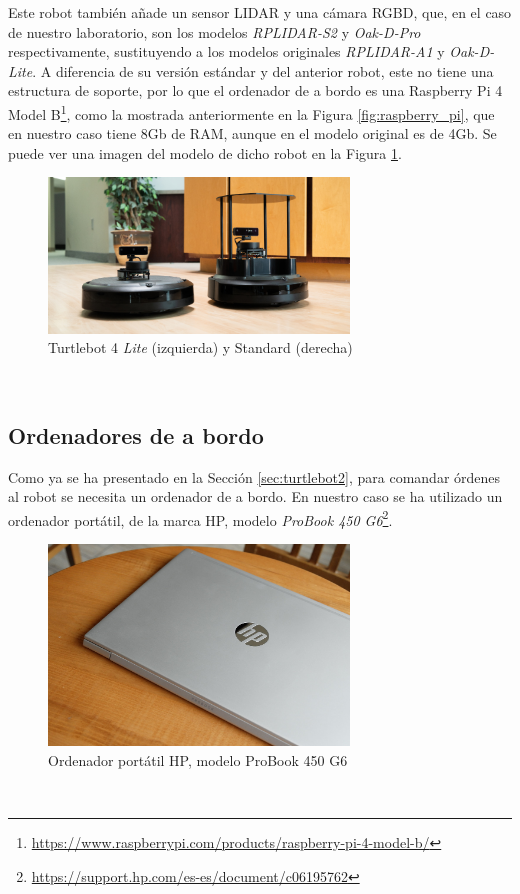 Este robot también añade un sensor LIDAR y una cámara RGBD, que, en el caso de
nuestro laboratorio, son los modelos \textit{RPLIDAR-S2} y \textit{Oak-D-Pro}
respectivamente, sustituyendo a los modelos originales \textit{RPLIDAR-A1} y
\textit{Oak-D-Lite}.
A diferencia de su versión estándar y del anterior robot, este no tiene una
estructura de soporte, por lo que el ordenador de a bordo es una Raspberry
Pi 4 Model B\footnote{
\url{https://www.raspberrypi.com/products/raspberry-pi-4-model-b/}}, como la
mostrada anteriormente en la Figura \ref{fig:raspberry_pi}, que en nuestro caso
tiene 8Gb de RAM, aunque en el modelo original es de 4Gb.
Se puede ver una imagen del modelo de dicho robot en la Figura
\ref{fig:turtlebot4}.
\\

\begin{figure} [h!]
  \begin{center}
    \includegraphics[width=8cm]{figs/turtlebot4}
  \end{center}
  \caption{Turtlebot 4 \textit{Lite} (izquierda) y Standard (derecha) \cite{turtlebot4}}
  \label{fig:turtlebot4}
\end{figure}\


\subsection{Ordenadores de a bordo}
\label{sec:a_bordo}

Como ya se ha presentado en la Sección \ref{sec:turtlebot2}, para comandar
órdenes al robot se necesita un ordenador de a bordo.
En nuestro caso se ha utilizado un ordenador portátil, de la marca HP, modelo
\textit{ProBook 450 G6}\footnote{
\url{https://support.hp.com/es-es/document/c06195762}}.
\\

\begin{figure} [h!]
  \begin{center}
    \includegraphics[width=8cm]{figs/hp_probook}
  \end{center}
  \caption{Ordenador portátil HP, modelo ProBook 450 G6 \cite{hp_probook}}
  \label{fig:hp_probook}
\end{figure}\

